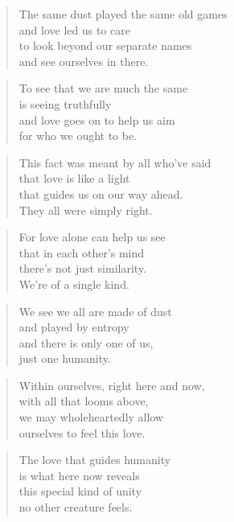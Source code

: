 \documentclass[10pt,a4paper]{article}
\begin{document}
\begin{paracol}{2}
\begin{verse}
The same dust played the same old games\\
and love led us to care\\
to look beyond our separate names\\
and see ourselves in there.
\end{verse}

\begin{verse}
To see that we are much the same\\
is seeing truthfully\\
and love goes on to help us aim\\
for who we ought to be.
\end{verse}

\begin{verse}
This fact was meant by all who’ve said\\
that love is like a light\\
that guides us on our way ahead.\\
They all were simply right.
\end{verse}

\begin{verse}
For love alone can help us see\\
that in each other’s mind\\
there’s not just similarity.\\
We’re of a single kind.
\end{verse}

\begin{verse}
We see we all are made of dust\\
and played by entropy\\
and there is only one of us,\\
just one humanity.
\end{verse}

\begin{verse}
Within ourselves, right here and now,\\
with all that looms above,\\
we may wholeheartedly allow\\
ourselves to feel this love.
\end{verse}

\begin{verse}
The love that guides humanity\\
is what here now reveals\\
this special kind of unity\\
no other creature feels.
\end{verse}


\end{paracol}
\end{document}
